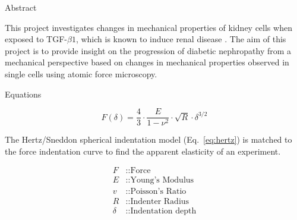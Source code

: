 \documentclass[a0paper,portrait]{baposter}
\begin{document}
\begin{poster}

\begin{posterbox}[name=abstract,column=0,row=0]{Abstract}
\begin{justify}
    This project investigates changes in mechanical properties of kidney
    cells when exposed to TGF-\(\beta 1\), which is known to induce
    renal disease \cite{gentleME2013-EpithelialCellTGFv}. The aim of this project is to provide insight
    on the progression of diabetic nephropathy from a mechanical
    perspective based on changes in mechanical properties observed in
    single cells using atomic force microscopy.
\end{justify}
\end{posterbox}

\begin{posterbox}[name=equations,column=0,below=abstract]{Equations}

\begin{small}

\begin{equation}
  F(\delta) = \frac{4}{3} \cdot \frac{E}{1 - \nu^2} \cdot \sqrt{R} \cdot \delta^{3/2}
  \label{eq:hertz}
\end{equation} 

\vspace*{5pt}

\begin{minipage}[t]{0.575\linewidth}
  \vspace*{0pt}

\begin{description}
  The Hertz/Sneddon spherical indentation model (Eq.~\ref{eq:hertz}) is matched to the force indentation curve to find the apparent elasticity of an experiment.
\end{description}

\end{minipage}
\hfill
\begin{minipage}[t]{0.2\linewidth}
  \vspace*{-20pt}
\begin{align*}
  F & \text{::Force}\\
  E & \text{::Young's Modulus}\\
  v & \text{::Poisson's Ratio}\\
  R & \text{::Indenter Radius}\\
  \delta & \text{::Indentation depth}\\
\end{align*}
\end{minipage}
\vspace*{-10pt}


\end{small}
\end{posterbox}
\end{poster}
\end{document}

